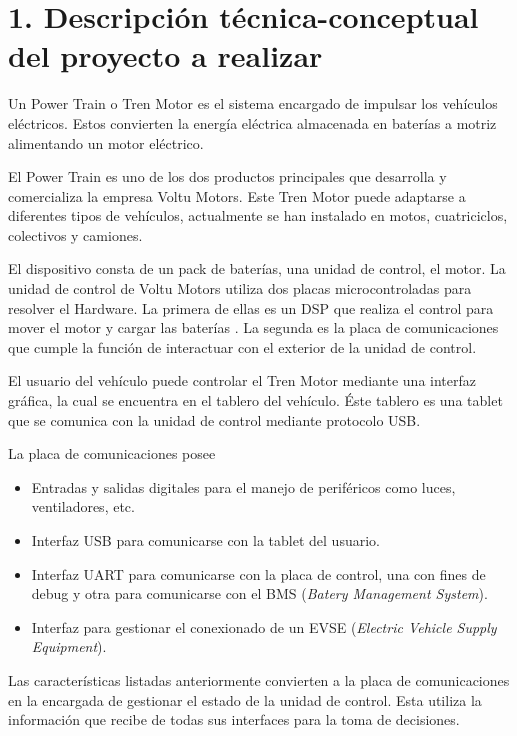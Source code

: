 \documentclass[
11pt, %
codirector, %
]{charter}
\begin{document}
\section{1. Descripción técnica-conceptual del proyecto a realizar}
\label{sec:descripcion}


Un Power Train o Tren Motor es el sistema encargado de impulsar los vehículos eléctricos. Estos convierten la energía eléctrica almacenada en baterías a motriz alimentando un motor eléctrico.

El Power Train es uno de los dos productos principales que desarrolla y comercializa la empresa Voltu Motors. Este Tren Motor puede adaptarse a diferentes tipos de vehículos, actualmente se han instalado en motos, cuatriciclos, colectivos y camiones.

El dispositivo consta de un pack de baterías, una unidad de control, el motor. La unidad de control de Voltu Motors utiliza dos placas microcontroladas para resolver el Hardware.
La primera de ellas es un DSP que realiza el control para mover el motor y cargar las baterías . La segunda es la placa de comunicaciones que cumple la función de interactuar con el exterior de la unidad de control.

El usuario del vehículo puede controlar el Tren Motor mediante una interfaz gráfica, la cual se encuentra en el tablero del vehículo. Éste tablero es una tablet que se comunica con la unidad de control mediante protocolo USB.

La placa de comunicaciones posee

\begin{itemize}
	\item Entradas y salidas digitales para el manejo de periféricos como luces, ventiladores, etc.
	\item Interfaz USB para comunicarse con la tablet del usuario.
	\item Interfaz UART para comunicarse con la placa de control, una con fines de debug y otra para comunicarse con el BMS (\textit{Batery Management System}).
	\item Interfaz para gestionar el conexionado de un EVSE (\textit{Electric Vehicle Supply Equipment}).
\end{itemize}

Las características listadas anteriormente convierten a la placa de comunicaciones en la encargada de gestionar el estado de la unidad de control. Esta utiliza la información que recibe de todas sus interfaces para la toma de decisiones.
\end{document}
